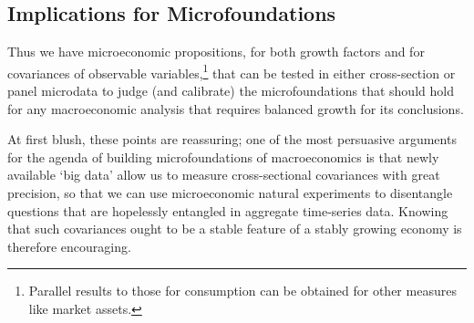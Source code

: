 \documentclass[\econtexRoot/BufferStockTheory]{subfiles}
\begin{document}

\hypertarget{microfounding-macro-needs-ergodicity}{}
\subsection{Implications for Microfoundations}\label{subsec:microfoundations}

Thus we have microeconomic propositions, for both growth factors and for covariances of observable variables,\footnote{Parallel results to those for consumption can be obtained for other measures like market assets.} that can be tested in either cross-section or panel microdata to judge (and calibrate) the microfoundations that should hold for any macroeconomic analysis that requires balanced growth for its conclusions.

At first blush, these points are reassuring; one of the most persuasive arguments for the agenda of building microfoundations of macroeconomics is that newly available `big data' allow us to measure cross-sectional covariances with great precision, so that we can use microeconomic natural experiments to disentangle questions that are hopelessly entangled in aggregate time-series data.
Knowing that such covariances ought to be a stable feature of a stably growing economy is therefore encouraging.
\end{document}
